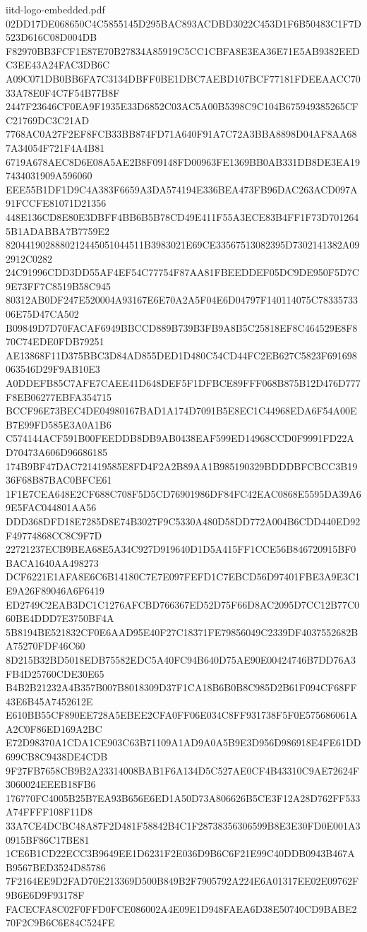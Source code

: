 \begin{filecontents*}[overwrite]{iitd-logo-embedded.pdf}
02DD17DE068650C4C5855145D295BAC893ACDBD3022C453D1F6B50483C1F7D523D616C08D004DB
F82970BB3FCF1E87E70B27834A85919C5CC1CBFA8E3EA36E71E5AB9382EEDC3EE43A24FAC3DB6C
A09C071DB0BB6FA7C3134DBFF0BE1DBC7AEBD107BCF77181FDEEAACC7033A78E0F4C7F54B77B8F
2447F23646CF0EA9F1935E33D6852C03AC5A00B5398C9C104B675949385265CFC21769DC3C21AD
7768AC0A27F2EF8FCB33BB874FD71A640F91A7C72A3BBA8898D04AF8AA687A34054F721F4A4B81
6719A678AEC8D6E08A5AE2B8F09148FD00963FE1369BB0AB331DB8DE3EA197434031909A596060
EEE55B1DF1D9C4A383F6659A3DA574194E336BEA473FB96DAC263ACD097A91FCCFE81071D21356
448E136CD8E80E3DBFF4BB6B5B78CD49E411F55A3ECE83B4FF1F73D7012645B1ADABBA7B7759E2
8204419028880212445051044511B3983021E69CE33567513082395D7302141382A092912C0282
24C91996CDD3DD55AF4EF54C77754F87AA81FBEEDDEF05DC9DE950F5D7C9E73FF7C8519B58C945
80312AB0DF247E520004A93167E6E70A2A5F04E6D04797F140114075C7833573306E75D47CA502
B09849D7D70FACAF6949BBCCD889B739B3FB9A8B5C25818EF8C464529E8F870C74EDE0FDB79251
AE13868F11D375BBC3D84AD855DED1D480C54CD44FC2EB627C5823F691698063546D29F9AB10E3
A0DDEFB85C7AFE7CAEE41D648DEF5F1DFBCE89FFF068B875B12D476D777F8EB06277EBFA354715
BCCF96E73BEC4DE04980167BAD1A174D7091B5E8EC1C44968EDA6F54A00EB7E99FD585E3A0A1B6
C574144ACF591B00FEEDDB8DB9AB0438EAF599ED14968CCD0F9991FD22AD70473A606D96686185
174B9BF47DAC721419585E8FD4F2A2B89AA1B985190329BDDDBFCBCC3B1936F68B87BAC0BFCE61
1F1E7CEA648E2CF688C708F5D5CD76901986DF84FC42EAC0868E5595DA39A69E5FAC044801AA56
DDD368DFD18E7285D8E74B3027F9C5330A480D58DD772A004B6CDD440ED92F49774868CC8C9F7D
22721237ECB9BEA68E5A34C927D919640D1D5A415FF1CCE56B846720915BF0BACA1640AA498273
DCF6221E1AFA8E6C6B14180C7E7E097FEFD1C7EBCD56D97401FBE3A9E3C1E9A26F89046A6F6419
ED2749C2EAB3DC1C1276AFCBD766367ED52D75F66D8AC2095D7CC12B77C060BE4DDD7E3750BF4A
5B8194BE521832CF0E6AAD95E40F27C18371FE79856049C2339DF4037552682BA75270FDF46C60
8D215B32BD5018EDB75582EDC5A40FC94B640D75AE90E00424746B7DD76A3FB4D25760CDE30E65
B4B2B21232A4B357B007B8018309D37F1CA18B6B0B8C985D2B61F094CF68FF43E6B45A7452612E
E610BB55CF890EE728A5EBEE2CFA0FF06E034C8FF931738F5F0E575686061AA2C0F86ED169A2BC
E72D98370A1CDA1CE903C63B71109A1AD9A0A5B9E3D956D986918E4FE61DD699CB8C9438DE4CDB
9F27FB7658CB9B2A23314008BAB1F6A134D5C527AE0CF4B43310C9AE72624F3060024EEEB18FB6
176770FC4005B25B7EA93B656E6ED1A50D73A806626B5CE3F12A28D762FF533A74FFFF108F11D8
33A7CE4DCBC48A87F2D481F58842B4C1F28738356306599B8E3E30FD0E001A30915BF86C17BE81
1CE6B1CD22ECC3B9649EE1D6231F2E036D9B6C6F21E99C40DDB0943B467AB9567BED3524D85786
7F2164EE9D2FAD70E213369D500B849B2F7905792A224E6A01317EE02E09762F9B6E6D9F93178F
FACECFA8C02F0FFD0FCE086002A4E09E1D948FAEA6D38E50740CD9BABE270F2C9B6C6E84C524FE

\end{filecontents*}

